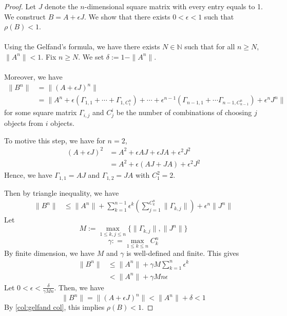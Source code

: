 \begin{proof}
    Let $J$ denote the $n$-dimensional square matrix with every entry equals to 1. We construct $B = A +\epsilon  J$. We show that there exists $0<\epsilon<1$ such that $\rho(B)<1$.\\
    \\
    Using the Gelfand's formula, we have there exists $N\in\mathbb{N}$ such that for all $n\ge N$, $\|A^n\|< 1$. Fix $n\ge N$. We set $\delta:= 1-\|A^n\|$.\\
    \\
    Moreover, we have 
    \begin{align*}
        \|B^n\| &= \|(A+\epsilon J)^n\|\\
        &= \|A^n +  \epsilon (\Gamma_{1,1} +\cdots + \Gamma_{1,C^n_1})+\cdots +  \epsilon^{n-1}(\Gamma_{n-1, 1} + \cdots \Gamma_{n-1, C^{n}_{n-1}}) +\epsilon^n J^n\|
    \end{align*}
    for some square matrix $\Gamma_{i,j}$ and $C^i_j$ be the number of combinations of choosing $j$ objects from $i$ objects.
    \begin{remark}
    To motive this step, we have for $n=2$,
    \begin{align*}
        (A + \epsilon J)^2  &= A^2 + \epsilon AJ + \epsilon J A + \epsilon^2 J^2\\
        &= A^2 + \epsilon (AJ +JA) +\epsilon ^2 J^2
    \end{align*}
    Hence, we have $\Gamma_{1,1} = AJ$ and $\Gamma_{1,2} = JA$ with $C^2_1 =2$.
\end{remark}
    \noindent Then by triangle inequality, we have
    \begin{align*}
         \|B^n\| &\le \|A^n\| + \sum_{k=1}^{n-1} \epsilon^k \left(\sum_{j=1}^{C^n_k} \|\Gamma_{k,j}\|\right) + \epsilon^n \|J^n\|
    \end{align*}
    Let 
    $$
    M:=\max_{1\le k,j\le n}\{\|\Gamma_{k,j}\|, \|J^n\|\}
    $$
    $$
    \gamma: =\max_{1\le k\le n} C^n_k
    $$
    By finite dimension, we have $M$ and $\gamma$ is well-defined and finite. This gives
   \begin{align*}
         \|B^n\| &\le \|A^n\| + \gamma M\sum_{k=1}^{n} \epsilon^k\\
         &<\|A^n\| + \gamma M n\epsilon \tag{$0<\epsilon<1$}
    \end{align*}
    Let $0<\epsilon <\frac{\delta}{\gamma Mn}$. Then, we have
    $$
    \|B^n\| = \|(A+\epsilon J)^n\|< \|A^n\| + \delta < 1
    $$
    By \autoref{col:gelfand col}, this implies $\rho(B)<1$.
\end{proof}
